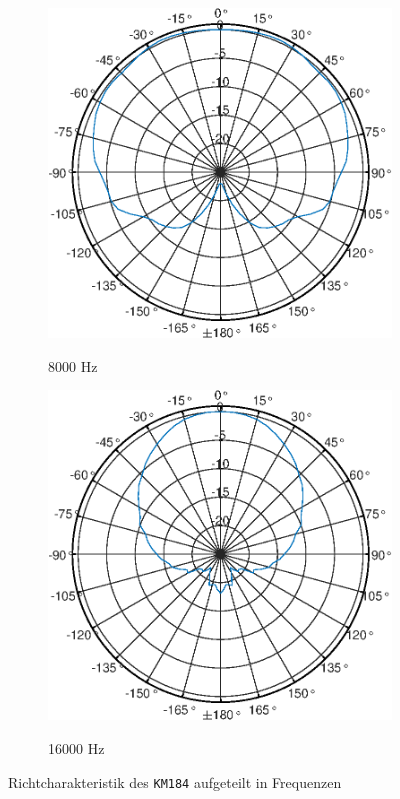 \begin{figure}[bth]
\begin{subfigure}{.25\textwidth}
        \label{fig:Polar_4000}
    \end{subfigure}%
    \begin{subfigure}{.25\textwidth}
        \centering
        \caption{8000 Hz}
        \includegraphics[width=\linewidth]{Figures/KM184_8000Hz}
        \label{fig:Polar_8000}
    \end{subfigure}%
    \begin{subfigure}{.25\textwidth}
        \centering
        \caption{16000 Hz}
        \includegraphics[width=\linewidth]{Figures/KM184_16000Hz}
        \label{fig:Polar_16000}
    \end{subfigure}
    \caption{Richtcharakteristik des \texttt{KM184} aufgeteilt in Frequenzen}
    \label{fig:Polar_sep}
\end{figure}

